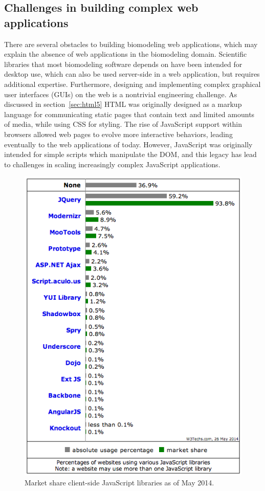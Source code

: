 \subsection{Challenges in building complex web applications}
There are several obstacles to building biomodeling web applications, which may explain the absence of web applications in the biomodeling domain.
Scientific libraries that most biomodeling software depends on have been intended for desktop use, which can also be used server-side in a web application, but requires additional expertise.
Furthermore, designing and implementing complex graphical user interfaces (GUIs) on the web is a nontrivial engineering challenge.
As discussed in section~\ref{sec:html5} HTML was originally designed as a markup language for communicating static pages that contain text and limited amounts of media, while using CSS for styling.
The rise of JavaScript support within browsers allowed web pages to evolve more interactive behaviors, leading eventually to the web applications of today.
However, JavaScript was originally intended for simple scripts which manipulate the DOM, and this legacy has lead to challenges in scaling increasingly complex JavaScript applications.

\begin{figure}
  \centering
  \includegraphics[width=\textwidth,natwidth=610,natheight=642]{images/jquery-marketshare.png}
  \caption{Market share client-side JavaScript libraries as of May 2014. \autocite{w3techs2014javascript}}
  \label{fig:jquery-marketshare}
\end{figure}

